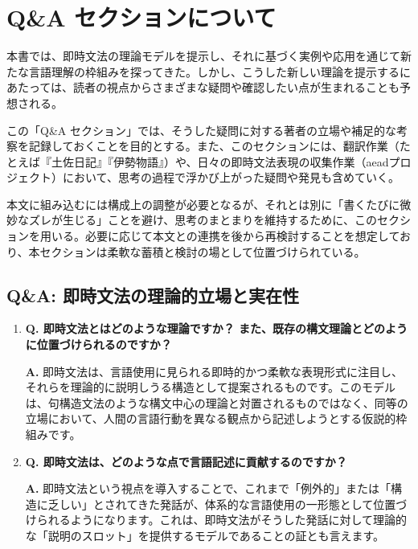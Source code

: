 \section{Q\&A セクションについて}

本書では、即時文法の理論モデルを提示し、それに基づく実例や応用を通じて新たな言語理解の枠組みを探ってきた。しかし、こうした新しい理論を提示するにあたっては、読者の視点からさまざまな疑問や確認したい点が生まれることも予想される。

この「Q\&A セクション」では、そうした疑問に対する著者の立場や補足的な考察を記録しておくことを目的とする。また、このセクションには、翻訳作業（たとえば『土佐日記』『伊勢物語』）や、日々の即時文法表現の収集作業（aeadプロジェクト）において、思考の過程で浮かび上がった疑問や発見も含めていく。

本文に組み込むには構成上の調整が必要となるが、それとは別に「書くたびに微妙なズレが生じる」ことを避け、思考のまとまりを維持するために、このセクションを用いる。必要に応じて本文との連携を後から再検討することを想定しており、本セクションは柔軟な蓄積と検討の場として位置づけられている。


\subsection{Q\&A: 即時文法の理論的立場と実在性}

\begin{enumerate}

  \item \textbf{Q. 即時文法とはどのような理論ですか？ また、既存の構文理論とどのように位置づけられるのですか？}

  \textbf{A.} 即時文法は、言語使用に見られる即時的かつ柔軟な表現形式に注目し、それらを理論的に説明しうる構造として提案されるものです。このモデルは、句構造文法のような構文中心の理論と対置されるものではなく、同等の立場において、人間の言語行動を異なる観点から記述しようとする仮説的枠組みです。

  \item \textbf{Q. 即時文法は、どのような点で言語記述に貢献するのですか？}

  \textbf{A.} 即時文法という視点を導入することで、これまで「例外的」または「構造に乏しい」とされてきた発話が、体系的な言語使用の一形態として位置づけられるようになります。これは、即時文法がそうした発話に対して理論的な「説明のスロット」を提供するモデルであることの証とも言えます。

\end{enumerate}
